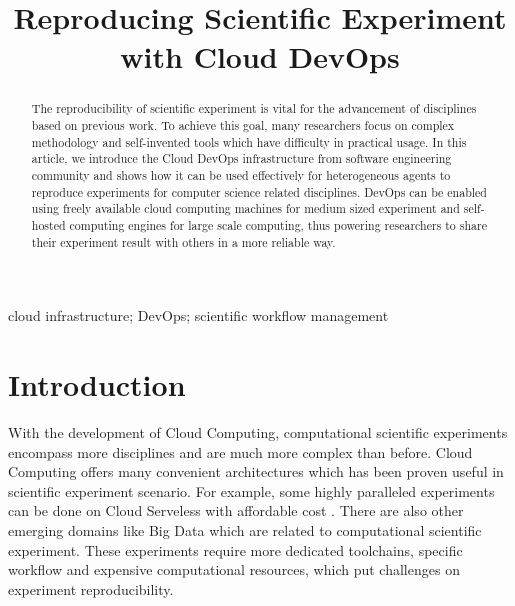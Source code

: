 \documentclass[10pt, conference, compsocconf]{IEEEtran}
\begin{document}
\title{Reproducing Scientific Experiment with Cloud DevOps}

\author{
\and
{}
\and
{}
\and
{}
}
\maketitle
\begin{abstract}
The reproducibility of scientific experiment is vital for the advancement of disciplines based on previous work. To achieve this goal, many researchers focus on complex methodology and self-invented tools which have difficulty in practical usage. In this article, we introduce the Cloud DevOps infrastructure from software engineering community and shows how it can be used effectively for heterogeneous agents to reproduce experiments for computer science related disciplines. DevOps can be enabled using freely available cloud computing machines for medium sized experiment and self-hosted computing engines for large scale computing, thus powering researchers to share their experiment result with others in a more reliable way.
\end{abstract}
\begin{IEEEkeywords}
cloud infrastructure; DevOps; scientific workflow management
\end{IEEEkeywords}

\section{Introduction}
With the development of Cloud Computing, computational scientific experiments encompass more disciplines and are much more complex than before. Cloud Computing offers many convenient architectures which has been proven useful in scientific experiment scenario.  For example, some highly paralleled experiments can be done on Cloud Serveless with affordable cost \cite{niu2019leveraging}. There are also other emerging domains like Big Data which are related to computational scientific experiment. These experiments require more dedicated toolchains, specific workflow and expensive computational resources, which put challenges on experiment reproducibility.
\end{document}
